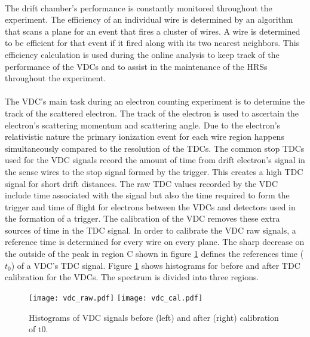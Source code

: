 

	\paragraph{}The drift chamber's performance is constantly monitored throughout the experiment. The efficiency of an individual wire is determined by an algorithm that scans a plane for an event that fires a cluster of wires. A wire is determined to be efficient for that event if it fired along with its two nearest neighbors. This efficiency calculation is used during the online analysis to keep track of the performance of the VDCs and to assist in the maintenance of the HRSs throughout the experiment. 

	\paragraph{}The VDC's main task during an electron counting experiment is to determine the track of the scattered electron. The track of the electron is used to ascertain the electron's scattering momentum and scattering angle. Due to the electron's relativistic nature the primary ionization event for each wire region happens simultaneously compared to the resolution of the TDCs. The common stop TDCs used for the VDC signals record the amount of time from drift electron's signal in the sense wires to the stop signal formed by the trigger. This creates a high TDC signal for short drift distances. The raw TDC values recorded by the VDC include time associated with the signal but also the time required to form the trigger and time of flight for electrons between the VDCs and detectors used in the formation of a trigger. The calibration of the VDC removes these extra sources of time in the TDC signal. In order to calibrate the VDC raw signals, a reference time is determined for every wire on every plane. The sharp decrease on the outside of the peak in region C shown in figure \ref{fig:vdcraw} defines the references time ($t_0$) of a VDC's TDC signal.
	Figure \ref{fig:vdcraw} shows histograms for before and after TDC calibration for the VDCs. The spectrum is divided into three regions.
		\begin{figure}[t]
		\centering
		\texttt{[image: vdc\_raw.pdf]}
		\texttt{[image: vdc\_cal.pdf]}
		\caption{Histograms of VDC signals before (left) and after (right) calibration of t0\cite{primer}.}
		\label{fig:vdcraw}
	\end{figure}
		

